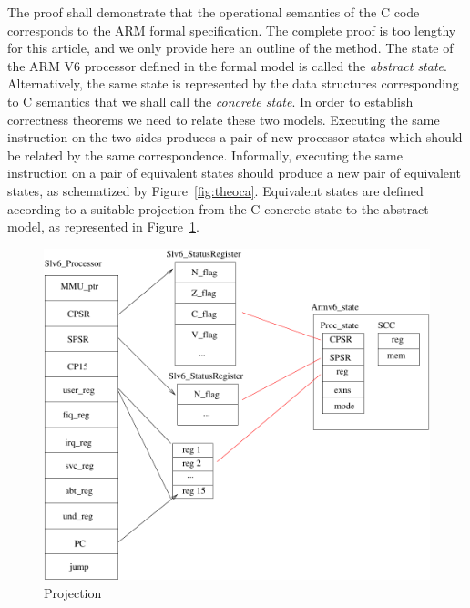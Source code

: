 \documentclass{llncs}
\begin{document}
The proof shall demonstrate that the operational semantics of the C
code corresponds to the ARM formal specification. The complete proof is
too lengthy for this article, and we only provide here an outline of
the method.  The state of the ARM V6 processor defined in the formal
model is called the \emph{abstract state}.  Alternatively, the same
state is represented by the data structures corresponding to C
semantics that we shall call the \emph{concrete state}.  In order to
establish correctness theorems we need to relate these two models.
Executing the same instruction on the two sides produces a pair of new
processor states which should be related by the same
correspondence. Informally, executing the same instruction on a pair
of equivalent states should produce a new pair of equivalent states,
as schematized by Figure~\ref{fig:theoca}.
%
Equivalent states are defined according to a suitable projection
from the C concrete state to the abstract model, as represented in
Figure~\ref{fig:proj}.
\begin{figure}[h]
\hfil\includegraphics[width=.75\linewidth]{fig/projection.pdf}
\caption{Projection}
\label{fig:proj}
\end{figure}
\end{document}
